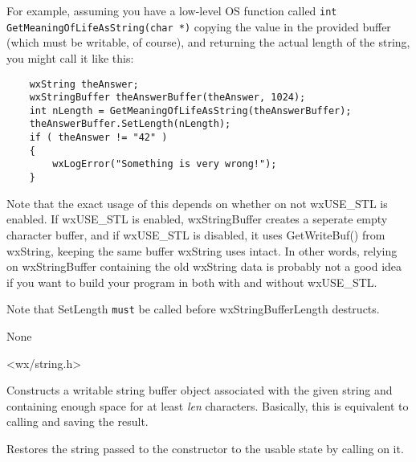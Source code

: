 For example, assuming you have a low-level OS function called 
{\tt int GetMeaningOfLifeAsString(char *)} copying the value in the provided
buffer (which must be writable, of course), and returning the actual length
of the string, you might call it like this:

\begin{verbatim}
    wxString theAnswer;
    wxStringBuffer theAnswerBuffer(theAnswer, 1024);
    int nLength = GetMeaningOfLifeAsString(theAnswerBuffer);
    theAnswerBuffer.SetLength(nLength);
    if ( theAnswer != "42" )
    {
        wxLogError("Something is very wrong!");
    }
\end{verbatim}

Note that the exact usage of this depends on whether on not wxUSE\_STL is enabled.  If
wxUSE\_STL is enabled, wxStringBuffer creates a seperate empty character buffer, and
if wxUSE\_STL is disabled, it uses GetWriteBuf() from wxString, keeping the same buffer
wxString uses intact.  In other words, relying on wxStringBuffer containing the old 
wxString data is probably not a good idea if you want to build your program in both
with and without wxUSE\_STL.

Note that SetLength {\tt must} be called before wxStringBufferLength destructs.


None


<wx/string.h>


\label{wxstringbufferlengthctor}


Constructs a writable string buffer object associated with the given string
and containing enough space for at least {\it len} characters. Basically, this
is equivalent to calling  and
saving the result.

\label{wxstringbufferlengthdtor}


Restores the string passed to the constructor to the usable state by calling 
 on it.

